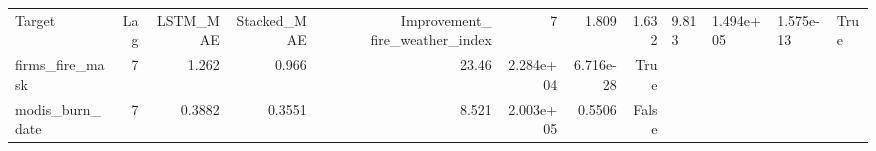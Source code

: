 \begin{tabular}{lrrrrrrr}
\toprule
Target & Lag & LSTM_MAE & Stacked_MAE & Improvement_%
\midrule
fire_weather_index & 7 & 1.809 & 1.632 & 9.813 & 1.494e+05 & 1.575e-13 & True \\
firms_fire_mask & 7 & 1.262 & 0.966 & 23.46 & 2.284e+04 & 6.716e-28 & True \\
modis_burn_date & 7 & 0.3882 & 0.3551 & 8.521 & 2.003e+05 & 0.5506 & False \\
\bottomrule
\end{tabular}
